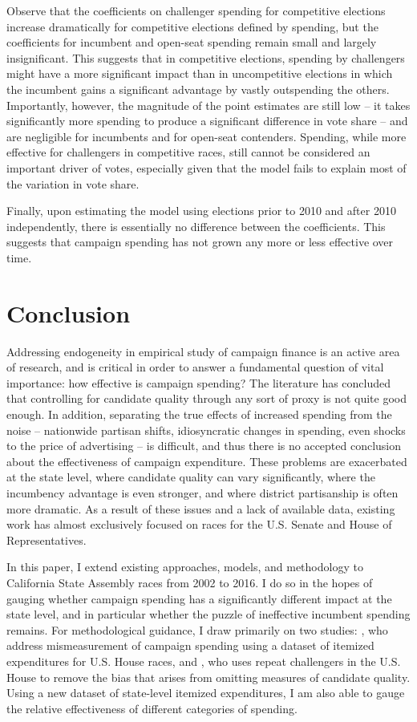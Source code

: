\documentclass{article}
\begin{document}
Observe that the coefficients on challenger spending for competitive elections increase dramatically for competitive elections defined by spending, but the coefficients for incumbent and open-seat spending remain small and largely insignificant. This suggests that in competitive elections, spending by challengers might have a more significant impact than in uncompetitive elections in which the incumbent gains a significant advantage by vastly outspending the others. Importantly, however, the magnitude of the point estimates are still low -- it takes significantly more spending to produce a significant difference in vote share -- and are negligible for incumbents and for open-seat contenders. Spending, while more effective for challengers in competitive races, still cannot be considered an important driver of votes, especially given that the model fails to explain most of the variation in vote share.

Finally, upon estimating the model using elections prior to 2010 and after 2010 independently, there is essentially no difference between the coefficients. This suggests that campaign spending has not grown any more or less effective over time.

\section{Conclusion}

Addressing endogeneity in empirical study of campaign finance is an active area of research, and is critical in order to answer a fundamental question of vital importance: how effective is campaign spending? The literature has concluded that controlling for candidate quality through any sort of proxy is not quite good enough. In addition, separating the true effects of increased spending from the noise -- nationwide partisan shifts, idiosyncratic changes in spending, even shocks to the price of advertising -- is difficult, and thus there is no accepted conclusion about the effectiveness of campaign expenditure. These problems are exacerbated at the state level, where candidate quality can vary significantly, where the incumbency advantage is even stronger, and where district partisanship is often more dramatic. As a result of these issues and a lack of available data, existing work has almost exclusively focused on races for the U.S. Senate and House of Representatives.

In this paper, I extend existing approaches, models, and methodology to California State Assembly races from 2002 to 2016. I do so in the hopes of gauging whether campaign spending has a significantly different impact at the state level, and in particular whether the puzzle of ineffective incumbent spending remains. For methodological guidance, I draw primarily on two studies: \cite{ansolabehere1994mismeasure}, who address mismeasurement of campaign spending using a dataset of itemized expenditures for U.S. House races, and \cite{levitt-1994}, who uses repeat challengers in the U.S. House to remove the bias that arises from omitting measures of candidate quality. Using a new dataset of state-level itemized expenditures, I am also able to gauge the relative effectiveness of different categories of spending.
\end{document}
